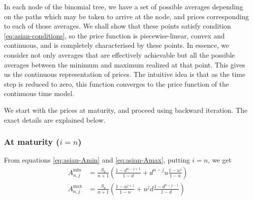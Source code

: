 In each node of the binomial tree, we have a set of possible averages depending on the paths which may be taken to arrive at the node, and prices corresponding to each of those averages. We shall show that these points satisfy condition \ref{eq:asian-conditions}, so the price function is piecewise-linear, convex and continuous, and is completely characterised by these points. In essence, we consider not only averages that are effectively achievable but all the possible averages between the minimum and maximum realized at that point. This gives us the continuous representation of prices. The intuitive idea is that as the time step is reduced to zero, this function converges to the price function of the continuous time model.

We start with the prices at maturity, and proceed using backward iteration. The exact details are explained below.


\subsubsection*{At maturity ($ i = n $)}

From equations \ref{eq:asian-Amin} and \ref{eq:asian-Amax}, putting $i = n$, we get
\begin{align*}
	A_{n,j}^{\min} &= \frac{S_0}{n+1} \left( \frac{1 - d^{n-j+1}}{1-d} + d^{n-j} u \frac{1 - u^{j}}{1-u} \right) \\
	A_{n,j}^{\max} &= \frac{S_0}{n+1} \left( \frac{1 - u^{j+1}}{1-u} + u^{j} d \frac{1 - d^{n-j-1}}{1-d} \right)
\end{align*}


